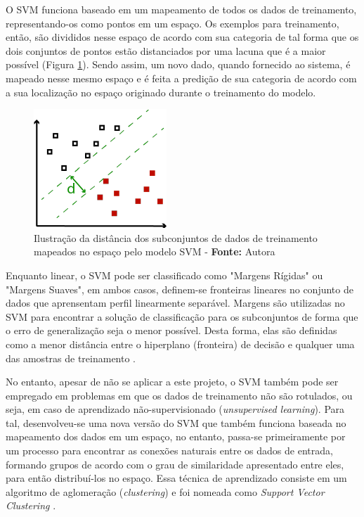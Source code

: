 O SVM funciona baseado em um mapeamento de todos os dados de treinamento, representando-os como pontos em um espaço. Os exemplos para treinamento, então, são divididos nesse espaço de acordo com sua categoria de tal forma que os dois conjuntos de pontos estão distanciados por uma lacuna que é a maior possível (Figura \ref{fig:svmDist}). Sendo assim, um novo dado, quando fornecido ao sistema, é mapeado nesse mesmo espaço e é feita a predição de sua categoria de acordo com a sua localização no espaço originado durante o treinamento do modelo.

\begin{figure}[H]
 \centering
  \includegraphics[width=0.4\linewidth]{figuras/svmDist.pdf}
  \caption{Ilustração da distância dos subconjuntos de dados de treinamento mapeados no espaço pelo modelo SVM - \textbf{Fonte:} Autora}
  \label{fig:svmDist}
\end{figure}

Enquanto linear, o SVM pode ser classificado como "Margens Rígidas" ou "Margens Suaves", em ambos casos, definem-se fronteiras lineares no conjunto de dados que aprensentam perfil linearmente separável. Margens são utilizadas no SVM para encontrar a solução de classificação para os subconjuntos de forma que o erro de generalização seja o menor possível. Desta forma, elas são definidas como a menor distância entre o hiperplano (fronteira) de decisão e qualquer uma das amostras de treinamento .

No entanto, apesar de não se aplicar a este projeto, o SVM também pode ser empregado em problemas em que os dados de treinamento não são rotulados, ou seja, em caso de aprendizado não-supervisionado (\textit{unsupervised learning}). Para tal, desenvolveu-se uma nova versão do SVM que também funciona baseada no mapeamento dos dados em um espaço, no entanto, passa-se primeiramente por um processo para encontrar as conexões naturais entre os dados de entrada, formando grupos de acordo com o grau de similaridade apresentado entre eles, para então distribuí-los no espaço. Essa técnica de aprendizado consiste em um algoritmo de aglomeração (\textit{clustering}) e foi nomeada como \textit{Support Vector Clustering} .

